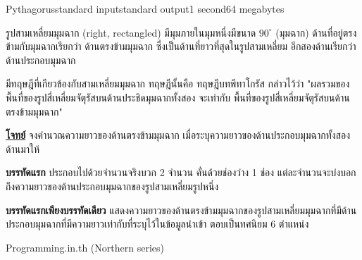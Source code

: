 \documentclass[11pt,a4paper]{article}
\begin{document}
\begin{problem}{Pythagorus}{standard input}{standard output}{1 second}{64 megabytes}

รูปสามเหลี่ยมมุมฉาก (right, rectangled) มีมุมภายในมุมหนึ่งมีขนาด $90^{\circ}$ (มุมฉาก) ด้านที่อยู่ตรงข้ามกับมุมฉากเรียกว่า ด้านตรงข้ามมุมฉาก ซึ่งเป็นด้านที่ยาวที่สุดในรูปสามเหลี่ยม อีกสองด้านเรียกว่า ด้านประกอบมุมฉาก

มีทฤษฎีที่เกียวข้องกับสามเหลี่ยมมุมฉาก ทฤษฎีนั้นคือ ทฤษฎีบทพีทาโกรัส กล่าวไว้ว่า "ผลรวมของพื้นที่ของรูปสี่เหลี่ยมจัตุรัสบนด้านประชิดมุมฉากทั้งสอง จะเท่ากับ พื้นที่ของรูปสี่เหลี่ยมจัตุรัสบนด้านตรงข้ามมุมฉาก"


\underline{\textbf{โจทย์}} จงคำนวณความยาวของด้านตรงข้ามมุมฉาก เมื่อระบุความยาวของด้านประกอบมุมฉากทั้งสองด้านมาให้

\InputFile

\textbf{บรรทัดแรก} ประกอบไปด้วยจำนวนจริงบวก 2 จำนวน คั่นด้วยช่องว่าง 1 ช่อง แต่ละจำนวนจะบ่งบอกถึงความยาวของด้านประกอบมุมฉากของรูปสามเหลี่ยมรูปหนึ่ง

\OutputFile

\textbf{บรรทัดแรกเพียงบรรทัดเดียว} แสดงความยาวของด้านตรงข้ามมุมฉากของรูปสามเหลี่ยมมุมฉากที่มีด้านประกอบมุมฉากที่มีความยาวเท่ากับที่ระบุไว้ในข้อมูลนำเข้า ตอบเป็นทศนิยม 6 ตำแหน่ง

\Examples

\begin{example}
%
\end{example}

\Source

Programming.in.th (Northern series)

\end{problem}
\end{document}
